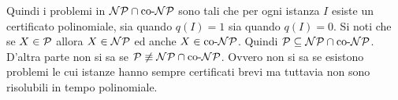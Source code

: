 Quindi i problemi in $\NP \cap \coNP$ sono tali che per ogni istanza $I$ esiste un certificato polinomiale, sia quando $q(I) = 1$ sia quando $q(I) = 0$. Si noti che se $X \in \P$ allora $X \in \NP$ ed anche $X \in \coNP$. Quindi $\P \subseteq \NP \cap \coNP$. D'altra parte non si sa se $\P \not \equiv \NP \cap \coNP$. Ovvero non si sa se esistono problemi le cui istanze hanno sempre certificati brevi ma tuttavia non sono risolubili in tempo polinomiale.

